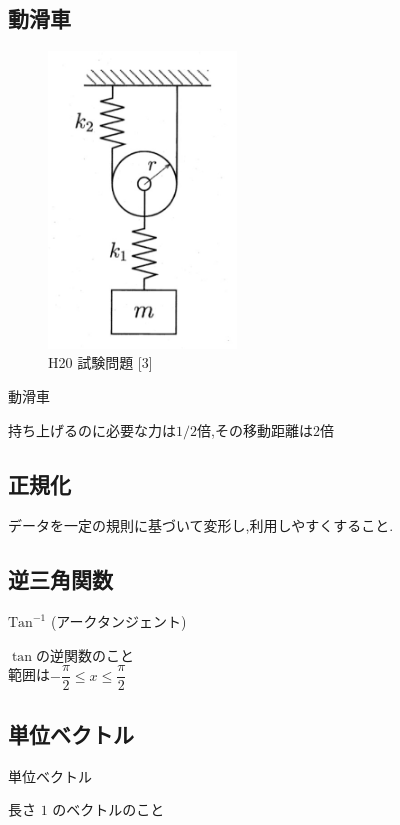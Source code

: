 \documentclass[a4paper]{jsarticle}
\begin{document}
\subsection{動滑車}
\begin{figure}[htbp]
    \begin{center}
        \includegraphics[width=50mm]{images/kiriki_image1.jpg}
        \caption{H20 試験問題 [3]}
    \end{center}
\end{figure}
\begin{itembox}[l]{動滑車}
    \begin{center}
        持ち上げるのに必要な力は$1/2$倍,その移動距離は$2$倍
    \end{center}
\end{itembox}
\subsection{正規化}
データを一定の規則に基づいて変形し,利用しやすくすること.
\subsection{逆三角関数}
\begin{itembox}[l]{$\mathrm{Tan}^{-1}$ (アークタンジェント)}
    \begin{center}
        $\tan$の逆関数のこと\\
        範囲は$-\dfrac{\pi}{2}\leq x \leq\dfrac{\pi}{2}$
    \end{center}
\end{itembox}
\subsection{単位ベクトル}
\begin{itembox}[l]{単位ベクトル}
    \begin{center}
        長さ $1$ のベクトルのこと
    \end{center}
\end{itembox}
\newpage
\end{document}
